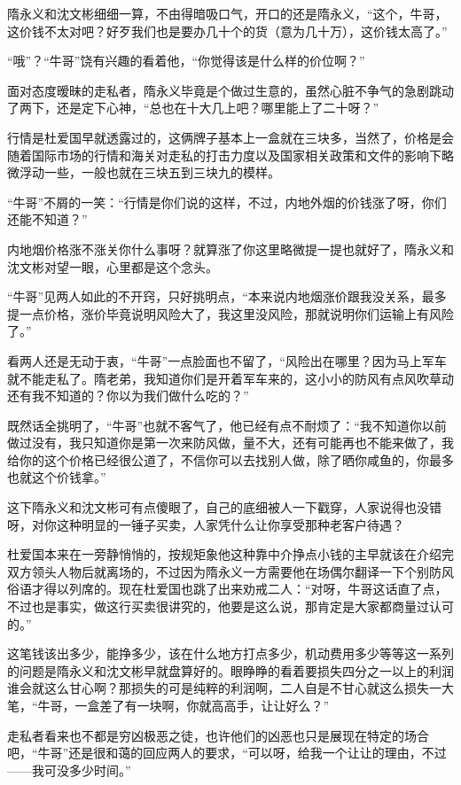隋永义和沈文彬细细一算，不由得暗吸口气，开口的还是隋永义，“这个，牛哥，这价钱不太对吧？好歹我们也是要办几十个的货（意为几十万），这价钱太高了。”

“哦”？“牛哥”饶有兴趣的看着他，“你觉得该是什么样的价位啊？”

面对态度暧昧的走私者，隋永义毕竟是个做过生意的，虽然心脏不争气的急剧跳动了两下，还是定下心神，“总也在十大几上吧？哪里能上了二十呀？”

行情是杜爱国早就透露过的，这俩牌子基本上一盒就在三块多，当然了，价格是会随着国际市场的行情和海关对走私的打击力度以及国家相关政策和文件的影响下略微浮动一些，一般也就在三块五到三块九的模样。

“牛哥”不屑的一笑：“行情是你们说的这样，不过，内地外烟的价钱涨了呀，你们还能不知道？”

内地烟价格涨不涨关你什么事呀？就算涨了你这里略微提一提也就好了，隋永义和沈文彬对望一眼，心里都是这个念头。

“牛哥”见两人如此的不开窍，只好挑明点，“本来说内地烟涨价跟我没关系，最多提一点价格，涨价毕竟说明风险大了，我这里没风险，那就说明你们运输上有风险了。”

看两人还是无动于衷，“牛哥”一点脸面也不留了，“风险出在哪里？因为马上军车就不能走私了。隋老弟，我知道你们是开着军车来的，这小小的防风有点风吹草动还有我不知道的？你以为我们做什么吃的？”

既然话全挑明了，“牛哥”也就不客气了，他已经有点不耐烦了：“我不知道你以前做过没有，我只知道你是第一次来防风做，量不大，还有可能再也不能来做了，我给你的这个价格已经很公道了，不信你可以去找别人做，除了晒你咸鱼的，你最多也就这个价钱拿。”

这下隋永义和沈文彬可有点傻眼了，自己的底细被人一下戳穿，人家说得也没错呀，对你这种明显的一锤子买卖，人家凭什么让你享受那种老客户待遇？

杜爱国本来在一旁静悄悄的，按规矩象他这种靠中介挣点小钱的主早就该在介绍完双方领头人物后就离场的，不过因为隋永义一方需要他在场偶尔翻译一下个别防风俗语才得以列席的。现在杜爱国也跳了出来劝戒二人：“对呀，牛哥这话直了点，不过也是事实，做这行买卖很讲究的，他要是这么说，那肯定是大家都商量过认可的。”

这笔钱该出多少，能挣多少，该在什么地方打点多少，机动费用多少等等这一系列的问题是隋永义和沈文彬早就盘算好的。眼睁睁的看着要损失四分之一以上的利润谁会就这么甘心啊？那损失的可是纯粹的利润啊，二人自是不甘心就这么损失一大笔，“牛哥，一盒差了有一块啊，你就高高手，让让好么？”

走私者看来也不都是穷凶极恶之徒，也许他们的凶恶也只是展现在特定的场合吧，“牛哥”还是很和蔼的回应两人的要求，“可以呀，给我一个让让的理由，不过——我可没多少时间。”

